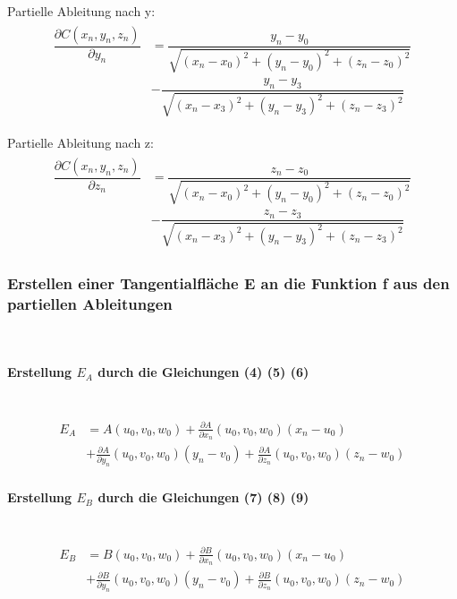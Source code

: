Partielle Ableitung nach y:
\begin{align}
\begin{split}
\dfrac{\partial C(x_{n},y_{n},z_{n})}{\partial y_{n}} &= \dfrac{y_{n}-y_{0}}{\sqrt{(x_{n}-x_{0})^{2}+ (y_{n}-y_{0})^{2}+(z_{n}-z_{0})^{2}}} \\ & - \dfrac{y_{n}-y_{3}}{\sqrt{(x_{n}-x_{3})^{2}+ (y_{n}-y_{3})^{2}+(z_{n}-z_{3})^{2}}}
\end{split}
\end{align}

Partielle Ableitung nach z:
\begin{align}
\begin{split}
\dfrac{\partial C(x_{n},y_{n},z_{n})}{\partial z_{n}} &= \dfrac{z_{n}-z_{0}}{\sqrt{(x_{n}-x_{0})^{2}+ (y_{n}-y_{0})^{2}+(z_{n}-z_{0})^{2}}} \\ & - \dfrac{z_{n}-z_{3}}{\sqrt{(x_{n}-x_{3})^{2}+ (y_{n}-y_{3})^{2}+(z_{n}-z_{3})^{2}}}
\end{split}
\end{align}


\subsubsection{Erstellen einer Tangentialfläche E an die Funktion f aus den partiellen Ableitungen} \ \\

\paragraph{Erstellung $E_{A}$ durch die Gleichungen (4) (5) (6)} \ \\
\begin{align}
\begin{split}
E_{A} &= A(u_{0},v_{0},w_{0}) + \frac{\partial A}{\partial x_{n}}(u_{0},v_{0},w_{0})(x_{n} - u_{0}) \\ &+ \frac{\partial A}{\partial y_{n}}(u_{0},v_{0},w_{0})(y_{n} - v_{0}) + \frac{\partial A}{\partial z_{n}}(u_{0},v_{0},w_{0})(z_{n} - w_{0})
\end{split}
\end{align}
\paragraph{Erstellung $E_{B}$ durch die Gleichungen (7) (8) (9)} \ \\
\begin{align}
\begin{split}
E_{B} &= B(u_{0},v_{0},w_{0}) + \frac{\partial B}{\partial x_{n}}(u_{0},v_{0},w_{0})(x_{n} - u_{0}) \\ &+ \frac{\partial B}{\partial y_{n}}(u_{0},v_{0},w_{0})(y_{n} - v_{0}) + \frac{\partial B}{\partial z_{n}}(u_{0},v_{0},w_{0})(z_{n} - w_{0})
\end{split}
\end{align}

